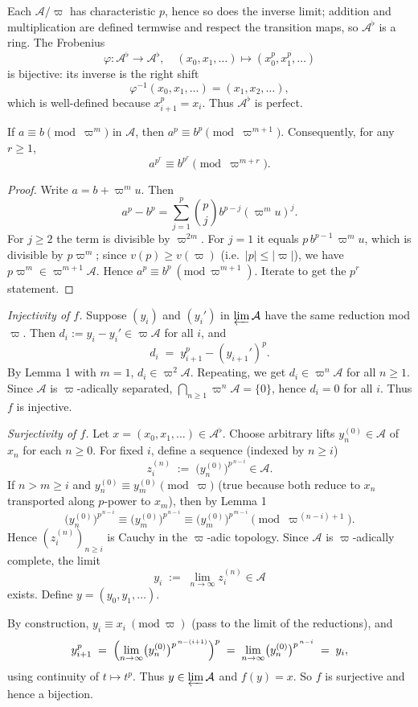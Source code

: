 \documentclass[12pt]{article}  %
\begin{document}
\begin{solution}
Each $\mathcal A/\varpi$ has characteristic $p$, hence so does the inverse limit; addition and multiplication are defined termwise and respect the transition maps, so $\mathcal A^\flat$ is a ring. The Frobenius
\[
\varphi: \mathcal A^\flat \to \mathcal A^\flat,\quad (x_0,x_1,\ldots)\mapsto(x_0^p,x_1^p,\ldots)
\]
is bijective: its inverse is the right shift
\[
\varphi^{-1}(x_0,x_1,\ldots)=(x_1,x_2,\ldots),
\]
which is well-defined because $x_{i+1}^p=x_i$. Thus $\mathcal A^\flat$ is perfect.

\begin{lemma}[1]
If $a\equiv b \pmod{\varpi^m}$ in $\mathcal A$, then $a^p\equiv b^p \pmod{\varpi^{m+1}}$. Consequently, for any $r\ge 1$,
\[
a^{p^r}\equiv b^{p^r} \pmod{\varpi^{m+r}}.
\]
\end{lemma}

\begin{proof}
Write $a=b+\varpi^m u$. Then
\[
a^p-b^p=\sum_{j=1}^p \binom pj b^{p-j}(\varpi^m u)^j.
\]
For $j\ge 2$ the term is divisible by $\varpi^{2m}$. For $j=1$ it equals $p\,b^{p-1}\,\varpi^m u$, which is divisible by $p\varpi^m$; since $v(p)\ge v(\varpi)$ (i.e.\ $|p|\le|\varpi|$), we have $p\varpi^m\in \varpi^{m+1}\mathcal A$. Hence $a^p\equiv b^p\ (\mathrm{mod}\ \varpi^{m+1})$. Iterate to get the $p^r$ statement.
\end{proof}

\noindent\emph{Injectivity of $f$.}
Suppose $(y_i)$ and $(y_i')$ in $\varprojlim \mathcal A$ have the same reduction mod $\varpi$. Then $d_i:=y_i-y_i'\in\varpi\mathcal A$ for all $i$, and
\[
d_i \;=\; y_{i+1}^p - (y_{i+1}')^p.
\]
By Lemma 1 with $m=1$, $d_i\in \varpi^2\mathcal A$. Repeating, we get $d_i\in \varpi^n\mathcal A$ for all $n\ge 1$. Since $\mathcal A$ is $\varpi$-adically separated, $\bigcap_{n\ge1}\varpi^n\mathcal A=\{0\}$, hence $d_i=0$ for all $i$. Thus $f$ is injective.

\smallskip
\noindent\emph{Surjectivity of $f$.}
Let $x=(x_0,x_1,\ldots)\in \mathcal A^\flat$. Choose arbitrary lifts $y_n^{(0)}\in\mathcal A$ of $x_n$ for each $n\ge 0$. For fixed $i$, define a sequence (indexed by $n\ge i$)
\[
z_i^{(n)} \;:=\; \bigl(y_n^{(0)}\bigr)^{p^{\,n-i}} \in \mathcal A.
\]
If $n>m\ge i$ and $y_n^{(0)}\equiv y_m^{(0)} \pmod{\varpi}$ (true because both reduce to $x_n$ transported along $p$-power to $x_m$), then by Lemma 1
\[
\bigl(y_n^{(0)}\bigr)^{p^{\,n-i}} \equiv \bigl(y_m^{(0)}\bigr)^{p^{\,n-i}} \equiv \bigl(y_m^{(0)}\bigr)^{p^{\,m-i}} \pmod{\varpi^{\, (n-i)+1}}.
\]
Hence $(z_i^{(n)})_{n\ge i}$ is Cauchy in the $\varpi$-adic topology. Since $\mathcal A$ is $\varpi$-adically complete, the limit
\[
y_i \;:=\; \lim_{n\to\infty} z_i^{(n)} \in \mathcal A
\]
exists. Define $y=(y_0,y_1,\ldots)$.

By construction, $y_i \equiv x_i \ (\mathrm{mod}\ \varpi)$ (pass to the limit of the reductions), and
\[
y_{i+1}^p \;=\; \Bigl(\lim_{n\to\infty} \bigl(y_n^{(0)}\bigr)^{p^{\,n-(i+1)}}\Bigr)^p
\;=\; \lim_{n\to\infty} \bigl(y_n^{(0)}\bigr)^{p^{\,n-i}}
\;=\; y_i,
\]
using continuity of $t\mapsto t^p$. Thus $y\in \varprojlim \mathcal A$ and $f(y)=x$. So $f$ is surjective and hence a bijection.
\end{solution}
\end{document}
